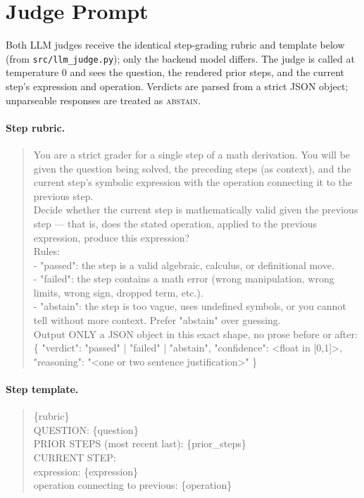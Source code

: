 \section{Judge Prompt}
\label{app:prompt}

Both LLM judges receive the identical step-grading rubric and template below
(from \texttt{src/llm\_judge.py}); only the backend model differs. The judge is
called at temperature $0$ and sees the question, the rendered prior steps, and
the current step's expression and operation. Verdicts are parsed from a strict
JSON object; unparseable responses are treated as \textsc{abstain}.

\paragraph{Step rubric.}
\begin{quote}\small\ttfamily
You are a strict grader for a single step of a math derivation. You will be
given the question being solved, the preceding steps (as context), and the
current step's symbolic expression with the operation connecting it to the
previous step.\\[4pt]
Decide whether the current step is mathematically valid given the previous
step --- that is, does the stated operation, applied to the previous expression,
produce this expression?\\[4pt]
Rules:\\
- "passed": the step is a valid algebraic, calculus, or definitional move.\\
- "failed": the step contains a math error (wrong manipulation, wrong limits,
wrong sign, dropped term, etc.).\\
- "abstain": the step is too vague, uses undefined symbols, or you cannot tell
without more context. Prefer "abstain" over guessing.\\[4pt]
Output ONLY a JSON object in this exact shape, no prose before or after:\\
\{ "verdict": "passed" | "failed" | "abstain", "confidence": <float in [0,1]>,
"reasoning": "<one or two sentence justification>" \}
\end{quote}

\paragraph{Step template.}
\begin{quote}\small\ttfamily
\{rubric\}\\[4pt]
QUESTION: \{question\}\\[4pt]
PRIOR STEPS (most recent last): \{prior\_steps\}\\[4pt]
CURRENT STEP:\\
\hspace*{1em}expression: \{expression\}\\
\hspace*{1em}operation connecting to previous: \{operation\}
\end{quote}

